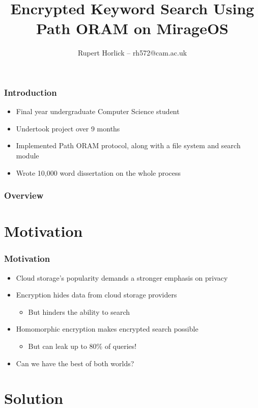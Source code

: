 \documentclass{beamer}
\title{Encrypted Keyword Search Using \\ Path ORAM on MirageOS}
\author{Rupert Horlick -- rh572@cam.ac.uk}
\begin{document}
\addtocounter{framenumber}{-1}
\frame[plain]{\titlepage}

\begin{frame}
    \frametitle{Introduction}
    \begin{itemize}
        \item Final year undergraduate Computer Science student
        \item Undertook project over 9 months
        \item Implemented Path ORAM protocol, along with a file system and search module
        \item Wrote 10,000 word dissertation on the whole process
    \end{itemize}
\end{frame}

\begin{frame}
    \frametitle{Overview}
    \tableofcontents
\end{frame}

\section{Motivation}

\begin{frame}
    \frametitle{Motivation}
    \begin{itemize}
        \item Cloud storage's popularity demands a stronger emphasis on privacy
        \item Encryption hides data from cloud storage providers
            \begin{itemize}
                \item But hinders the ability to search
            \end{itemize}
        \item Homomorphic encryption makes encrypted search possible
            \begin{itemize}
                \item But can leak up to 80\% of queries!
            \end{itemize}
        \item Can we have the best of both worlds?
    \end{itemize}
\end{frame}

\section{Solution}
\end{document}
